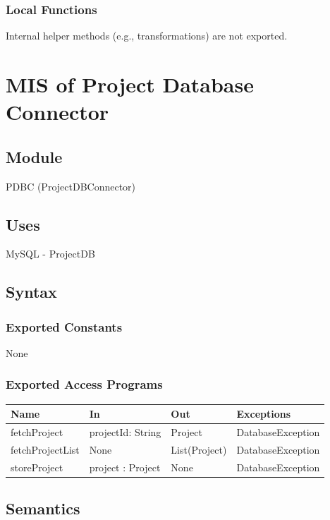 \documentclass[12pt, titlepage]{article}
\begin{document}
    \subsubsection{Local Functions}
        Internal helper methods (e.g., transformations) are not exported.



\section{MIS of Project Database Connector} \label{pdbc} 
    \subsection{Module}
        PDBC (ProjectDBConnector)

    \subsection{Uses}
        MySQL - ProjectDB

    \subsection{Syntax}
    \subsubsection{Exported Constants}
        None

    \subsubsection{Exported Access Programs}
    \begin{center}\begin{tabular}{p{3cm} p{4cm} p{3cm} p{3cm}}
    \hline\textbf{Name} & \textbf{In} & \textbf{Out} & \textbf{Exceptions} \\
    \hline
        fetchProject & projectId: String & Project & DatabaseException \\
        fetchProjectList & None & List(Project) & DatabaseException \\
        storeProject & project : Project & None & DatabaseException \\
    \hline
    \end{tabular}\end{center}

    \subsection{Semantics}
\end{document}
